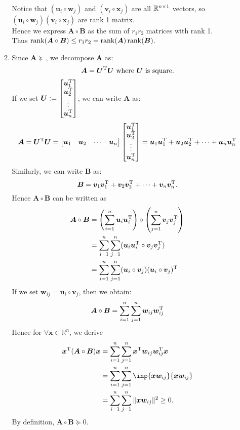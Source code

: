 \begin{enumerate}
\begin{enumerate}
\begin{align*}
\end{align*}
Notice that $(\bm u_i\circ\bm w_j)$ and $(\bm v_i\circ\bm x_j)$ are all $\mathbb{R}^{n\times 1}$ vectors, so $(\bm u_i\circ\bm w_j)(\bm v_i\circ\bm x_j)$ are rank 1 matrix. 
\\Hence we express $\bm A\circ\bm B$ as the sum of $r_1r_2$ matrices with rank 1.\\Thus $\operatorname{rank}(\bm A\circ\bm B)\le r_1r_2=\operatorname{rank}(\bm A)\operatorname{rank}(\bm B).$
\item
Since $\bm A\succeq$, we decompose $\bm A$ as:
\[
\bm A=\bm U^{\mathrm T}\bm U\text{ where $\bm U$ is square.}
\]
If we set $\bm U:=\begin{bmatrix}
\bm u_1^{\mathrm T}\\\bm u_2^{\mathrm T}\\\vdots\\\bm u_n^{\mathrm T}
\end{bmatrix}$, we can write $\bm A$ as:
\[
\bm A=\bm U^{\mathrm T}\bm U=\begin{bmatrix}
\bm u_1&\bm u_2&\cdots&\bm u_n
\end{bmatrix}\begin{bmatrix}
\bm u_1^{\mathrm T}\\\bm u_2^{\mathrm T}\\\vdots\\\bm u_n^{\mathrm T}
\end{bmatrix}=\bm u_1\bm u_1^{\mathrm T}+\bm u_2\bm u_2^{\mathrm T}+\cdots+\bm u_n\bm u_n^{\mathrm T}
\]
Similarly, we can write $\bm B$ as:
\[
\bm B=\bm v_1\bm v_1^{\mathrm T}+\bm v_2\bm v_2^{\mathrm T}+\cdots+\bm v_n\bm v_n^{\mathrm T}.
\]
Hence $\bm A\circ\bm B$ can be written as
\begin{align*}
\bm A\circ\bm B&=\left(
\sum_{i=1}^{n}\bm u_i\bm u_i^{\mathrm T}
\right)\circ\left(
\sum_{j=1}^{n}\bm v_j\bm v_j^{\mathrm T}
\right)\\
&=\sum_{i=1}^{n}\sum_{j=1}^{n}(\bm u_i\bm u_i^{\mathrm T}\circ\bm v_j\bm v_j^{\mathrm T})\\
&=\sum_{i=1}^{n}\sum_{j=1}^{n}(\bm u_i\circ\bm v_j)(\bm u_i\circ\bm v_j)^{\mathrm T}
\end{align*}
If we set $\bm w_{ij}=\bm u_i\circ\bm v_j$, then we obtain:
\[
\bm A\circ\bm B=\sum_{i=1}^{n}\sum_{j=1}^{n}\bm w_{ij}\bm w_{ij}^{\mathrm T}
\]
Hence for $\forall\bm x\in\mathbb{R}^{n}$, we derive
\begin{align*}
\bm x\trans(\bm A\circ\bm B)\bm x&=\sum_{i=1}^{n}\sum_{j=1}^{n}\bm x\trans\bm w_{ij}\bm w_{ij}\trans\bm x\\
&=\sum_{i=1}^{n}\sum_{j=1}^{n}\inp{\bm x\bm w_{ij}}{\bm x\bm w_{ij}}\\
&=\sum_{i=1}^{n}\sum_{j=1}^{n}\|\bm x\bm w_{ij}\|^2\ge0.
\end{align*}
By definition, $\bm A\circ\bm B\succeq0.$
\end{enumerate}
\end{enumerate}